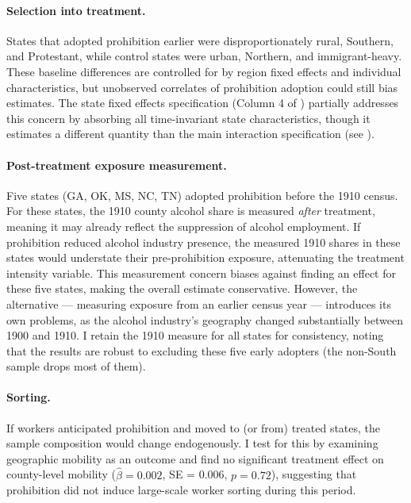 \documentclass[12pt]{article}
\begin{document}
\paragraph{Selection into treatment.} States that adopted prohibition earlier were disproportionately rural, Southern, and Protestant, while control states were urban, Northern, and immigrant-heavy. These baseline differences are controlled for by region fixed effects and individual characteristics, but unobserved correlates of prohibition adoption could still bias estimates. The state fixed effects specification (Column 4 of ) partially addresses this concern by absorbing all time-invariant state characteristics, though it estimates a different quantity than the main interaction specification (see ).

\paragraph{Post-treatment exposure measurement.} Five states (GA, OK, MS, NC, TN) adopted prohibition before the 1910 census. For these states, the 1910 county alcohol share is measured \emph{after} treatment, meaning it may already reflect the suppression of alcohol employment. If prohibition reduced alcohol industry presence, the measured 1910 shares in these states would understate their pre-prohibition exposure, attenuating the treatment intensity variable. This measurement concern biases against finding an effect for these five states, making the overall estimate conservative. However, the alternative --- measuring exposure from an earlier census year --- introduces its own problems, as the alcohol industry's geography changed substantially between 1900 and 1910. I retain the 1910 measure for all states for consistency, noting that the results are robust to excluding these five early adopters (the non-South sample drops most of them).

\paragraph{Sorting.} If workers anticipated prohibition and moved to (or from) treated states, the sample composition would change endogenously. I test for this by examining geographic mobility as an outcome and find no significant treatment effect on county-level mobility ($\hat{\beta} = 0.002$, SE = 0.006, $p = 0.72$), suggesting that prohibition did not induce large-scale worker sorting during this period.
\end{document}
